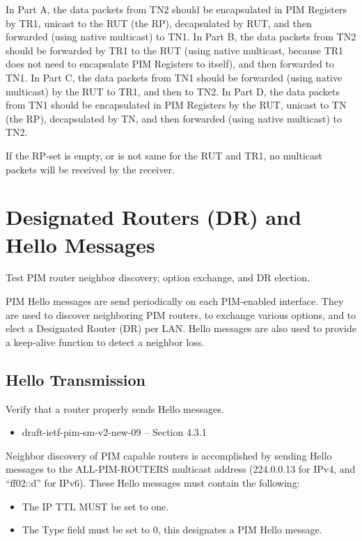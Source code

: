 \documentclass[11pt]{report}
\begin{document}
In Part A, the data packets from TN2 should be encapsulated in PIM Registers
by TR1, unicast to the RUT (the RP), decapsulated by RUT, and then forwarded
(using native multicast) to TN1.
In Part B, the data packets from TN2 should be forwarded by TR1 to the RUT
(using native multicast, because TR1 does not need to encapsulate PIM Registers
to itself), and then forwarded to TN1.
In Part C, the data packets from TN1 should be forwarded (using native
multicast) by the RUT to TR1, and then to TN2.
In Part D, the data packets from TN1 should be encapsulated in PIM Registers
by the RUT, unicast to TN (the RP), decapsulated by TN, and then forwarded
(using native multicast) to TN2.

If the RP-set is empty, or is not same for
the RUT and TR1, no multicast packets will be received by the receiver.

\chapter{Designated Routers (DR) and Hello Messages}

Test PIM router neighbor discovery, option exchange, and DR election.

PIM Hello messages are send periodically on each
PIM-enabled interface. They are used to discover neighboring PIM routers,
to exchange various options, and to elect a Designated Router (DR) per LAN.
Hello messages are also used to provide a keep-alive function to detect a
neighbor loss.

\newpage
\section{Hello Transmission}

Verify that a router properly sends Hello messages.

\begin{itemize}
  \item draft-ietf-pim-sm-v2-new-09 -- Section 4.3.1
\end{itemize}

Neighbor discovery of PIM capable routers is accomplished by sending Hello
messages to the ALL-PIM-ROUTERS multicast address (224.0.0.13 for IPv4,
and ``ff02::d'' for IPv6). These Hello messages must contain the following:
\begin{itemize}

  \item The IP TTL MUST be set to one.

  \item The Type field must be set to 0, this designates a PIM Hello message.

\end{itemize}
\end{document}
